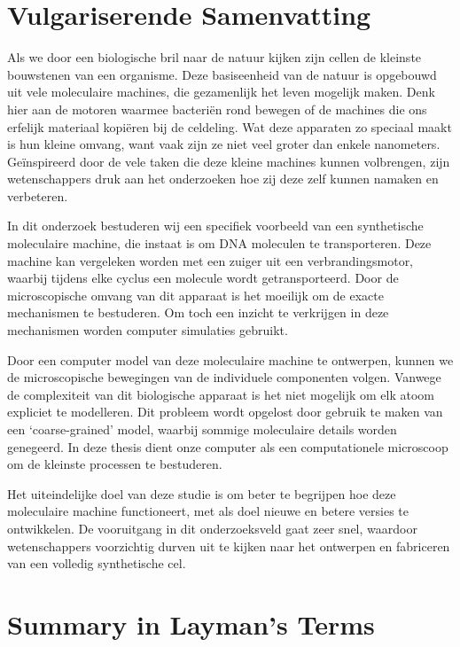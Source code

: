 \chapter*{Vulgariserende Samenvatting}

Als we door een biologische bril naar de natuur kijken zijn cellen de kleinste bouwstenen
van een organisme. Deze basiseenheid van de natuur is opgebouwd uit vele moleculaire
machines, die gezamenlijk het leven mogelijk maken. Denk hier aan de motoren waarmee
bacteriën rond bewegen of de machines die ons erfelijk materiaal kopiëren bij de
celdeling. Wat deze apparaten zo speciaal maakt is hun kleine omvang, want vaak zijn ze
niet veel groter dan enkele nanometers. Geïnspireerd door de vele taken die deze kleine
machines kunnen volbrengen, zijn wetenschappers druk aan het onderzoeken hoe zij deze
zelf kunnen namaken en verbeteren.

In dit onderzoek bestuderen wij een specifiek voorbeeld van een synthetische moleculaire
machine, die instaat is om DNA moleculen te transporteren. Deze machine kan vergeleken
worden met een zuiger uit een verbrandingsmotor, waarbij tijdens elke cyclus een molecule
wordt getransporteerd. Door de microscopische omvang van dit apparaat is het moeilijk om
de exacte mechanismen te bestuderen. Om toch een inzicht te verkrijgen in deze
mechanismen worden computer simulaties gebruikt.

Door een computer model van deze moleculaire machine te ontwerpen, kunnen we de
microscopische bewegingen van de individuele componenten volgen. Vanwege de complexiteit
van dit biologische apparaat is het niet mogelijk om elk atoom expliciet te modelleren.
Dit probleem wordt opgelost door gebruik te maken van een ‘coarse-grained’ model, waarbij
sommige moleculaire details worden genegeerd. In deze thesis dient onze computer als een
computationele microscoop om de kleinste processen te bestuderen.

Het uiteindelijke doel van deze studie is om beter te begrijpen hoe deze moleculaire
machine functioneert, met als doel nieuwe en betere versies te ontwikkelen. De
vooruitgang in dit onderzoeksveld gaat zeer snel, waardoor wetenschappers voorzichtig
durven uit te kijken naar het ontwerpen en fabriceren van een volledig synthetische cel.


\cleardoublepage
{}
\chapter*{Summary in Layman's Terms}

